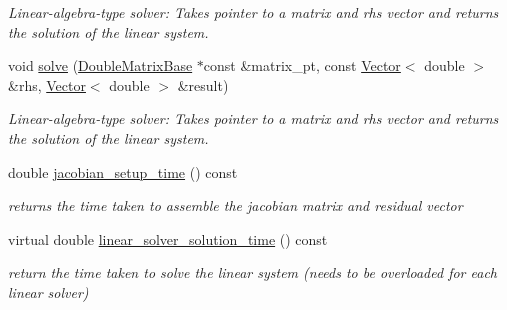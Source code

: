 \begin{DoxyCompactItemize}
\begin{DoxyCompactList}\small\item\em Linear-\/algebra-\/type solver\+: Takes pointer to a matrix and rhs vector and returns the solution of the linear system. \end{DoxyCompactList}\item 
void \hyperlink{classoomph_1_1DenseLU_a1d79cf13a269733d655e3e90c447f84d}{solve} (\hyperlink{classoomph_1_1DoubleMatrixBase}{Double\+Matrix\+Base} $\ast$const \&matrix\+\_\+pt, const \hyperlink{classoomph_1_1Vector}{Vector}$<$ double $>$ \&rhs, \hyperlink{classoomph_1_1Vector}{Vector}$<$ double $>$ \&result)
\begin{DoxyCompactList}\small\item\em Linear-\/algebra-\/type solver\+: Takes pointer to a matrix and rhs vector and returns the solution of the linear system. \end{DoxyCompactList}\item 
double \hyperlink{classoomph_1_1DenseLU_a4605ec2ca02ff0b30f4cefc2458dfb66}{jacobian\+\_\+setup\+\_\+time} () const
\begin{DoxyCompactList}\small\item\em returns the time taken to assemble the jacobian matrix and residual vector \end{DoxyCompactList}\item 
virtual double \hyperlink{classoomph_1_1DenseLU_aabe93cf400bb488f0bc08755ee0dfde4}{linear\+\_\+solver\+\_\+solution\+\_\+time} () const
\begin{DoxyCompactList}\small\item\em return the time taken to solve the linear system (needs to be overloaded for each linear solver) \end{DoxyCompactList}\end{DoxyCompactItemize}
